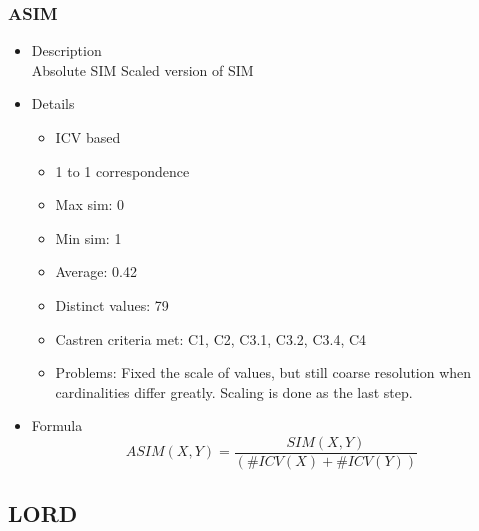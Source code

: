 \documentclass{article}
\begin{document}
\subsubsection{ASIM}
\label{sec-6-1-3}
\begin{itemize}

\item Description\\
\label{sec-6-1-3-1}%
Absolute SIM
Scaled version of SIM

\item Details
\label{sec-6-1-3-2}%
\begin{itemize}
\item ICV based
\item 1 to 1 correspondence
\item Max sim: 0
\item Min sim: 1
\item Average: 0.42
\item Distinct values: 79
\item Castren criteria met: C1, C2, C3.1, C3.2, C3.4, C4
\item Problems: Fixed the scale of values, but still coarse resolution
  when cardinalities differ greatly. Scaling is done as the last step.
\end{itemize}

\item Formula\\
\label{sec-6-1-3-3}%
$$
ASIM\left(X,Y\right)=\frac{SIM\left(X,Y\right)}{\left(\#ICV\left(X\right)+\#ICV\left(Y\right)\right)}
$$
\end{itemize} %
\subsection{LORD}
\label{sec-6-2}
\end{document}
